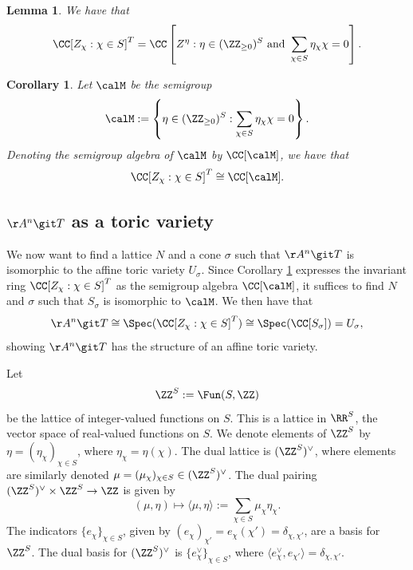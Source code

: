 \documentclass[12pt]{amsart}
\theoremstyle{plain}
\newtheorem{corollary}[theorem]{Corollary}
\newtheorem{lemma}[theorem]{Lemma}
\begin{document}
\begin{lemma}
We have that 
$$\CC[Z_\chi : \chi \in S]^T = \CC\left[Z^\eta : \eta \in (\ZZ_{\ge 0})^S \text{ and }\sum_{\chi \in S} \eta_\chi \chi = 0\right].$$
\end{lemma}
\begin{corollary}\label{invariantringsemigroupalgebra}
Let $\calM$ be the semigroup 
$$\calM := \left\{ \eta \in (\ZZ_{\ge 0})^S : \sum_{\chi \in S} \eta_\chi \chi = 0\right\}.$$
Denoting the semigroup algebra of $\calM$ by $\CC[\calM]$, we have that
$$\CC[Z_\chi : \chi \in S]^T \cong \CC[\calM].$$
\end{corollary}

\subsection{$\AA^n \git T$ as a toric variety}
We now want to find a lattice $N$ and a cone $\sigma$ such that $\AA^n \git T$ is isomorphic to the affine toric variety $U_\sigma$.
Since Corollary \ref{invariantringsemigroupalgebra} expresses the invariant ring $\CC[Z_\chi : \chi \in S]^T$ as the semigroup algebra $\CC[\calM]$, it suffices to find $N$ and $\sigma$ such that $S_\sigma$ is isomorphic to $\calM$.
We then have that
$$\AA^n \git T \cong \Spec(\CC[Z_\chi : \chi \in S]^T) \cong \Spec(\CC[S_\sigma]) = U_\sigma,$$
showing $\AA^n \git T$ has the structure of an affine toric variety.

Let 
$$\ZZ^S := \Fun(S, \ZZ)$$
be the lattice of integer-valued functions on $S$.
This is a lattice in $\RR^S$, the vector space of real-valued functions on $S$.
We denote elements of $\ZZ^S$ by $\eta = (\eta_\chi)_{\chi \in S}$, where $\eta_\chi = \eta(\chi)$.
The dual lattice is $(\ZZ^S)^\vee$, where elements are similarly denoted $\mu = (\mu_\chi)_{\chi \in S} \in (\ZZ^S)^\vee$.
The dual pairing $(\ZZ^S)^\vee \times \ZZ^S \to \ZZ$ is given by
$$(\mu, \eta) \mapsto \langle \mu, \eta \rangle := \sum_{\chi \in S} \mu_\chi \eta_\chi.$$
The indicators $\{e_\chi\}_{\chi\in S}$, given by $(e_\chi)_{\chi'} = e_\chi(\chi') = \delta_{\chi, \chi'}$, are a basis for $\ZZ^S$.
The dual basis for $(\ZZ^S)^\vee$ is $\{e_\chi^\vee\}_{\chi\in S}$, where $\langle e_\chi^\vee, e_{\chi'} \rangle = \delta_{\chi, \chi'}$.
\end{document}
